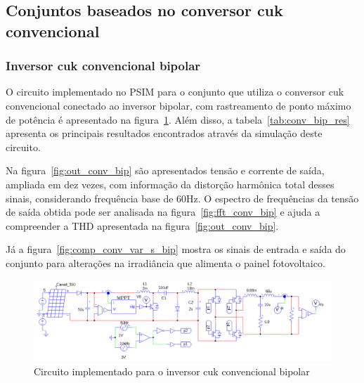 \documentclass[
	12pt,				%
	openany,
	onseside,
	a4paper,			%
	english,			%
	french,				%
	spanish,			%
	brazil,				%
	]{abntex2}
\begin{document}
\subsection{Conjuntos baseados no conversor cuk convencional}
\subsubsection{Inversor cuk convencional bipolar}

O circuito implementado no PSIM para o conjunto que utiliza o conversor cuk convencional conectado ao inversor bipolar, com rastreamento de ponto máximo de potência é apresentado na figura~\ref{fig:comp_conv_circ_clean}. Além disso, a tabela~\ref{tab:conv_bip_res} apresenta os principais resultados encontrados através da simulação deste circuito.

Na figura~\ref{fig:out_conv_bip} são apresentados tensão e corrente de saída, ampliada em dez vezes, com informação da distorção harmônica total desses sinais, considerando frequência base de 60Hz. O espectro de frequências da tensão de saída obtida pode ser analisada na figura~\ref{fig:fft_conv_bip} e ajuda a compreender a THD apresentada na figura~\ref{fig:out_conv_bip}.

Já a figura~\ref{fig:comp_conv_var_s_bip} mostra os sinais de entrada e saída do conjunto para alterações na irradiância que alimenta o painel fotovoltaico.

\begin{figure}[H]%
	\captionsetup{justification=centering}
	\centering
		\includegraphics[width= \linewidth]{comp_conv_circ_clean}
		\caption{Circuito implementado para o inversor cuk convencional bipolar}
		\label{fig:comp_conv_circ_clean}
\end{figure}
\end{document}
